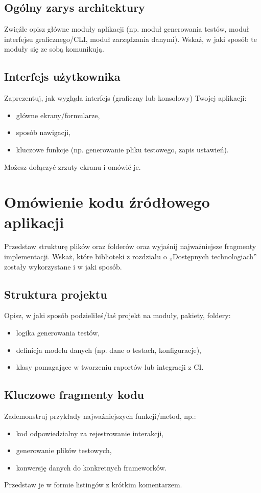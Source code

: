 \documentclass[12pt]{report}
\begin{document}
\section{Ogólny zarys architektury}
{Zwięźle opisz główne moduły aplikacji (np. moduł generowania testów, moduł interfejsu graficznego/CLI, moduł zarządzania danymi). Wskaż, w jaki sposób te moduły się ze sobą komunikują.}

\section{Interfejs użytkownika}
{Zaprezentuj, jak wygląda interfejs (graficzny lub konsolowy) Twojej aplikacji:
\begin{itemize}
    \item główne ekrany/formularze,
    \item sposób nawigacji,
    \item kluczowe funkcje (np. generowanie pliku testowego, zapis ustawień).
\end{itemize}
Możesz dołączyć zrzuty ekranu i omówić je.}


\chapter{Omówienie kodu źródłowego aplikacji}
{Przedstaw strukturę plików oraz folderów oraz wyjaśnij najważniejsze fragmenty implementacji. Wskaż, które biblioteki z rozdziału o „Dostępnych technologiach” zostały wykorzystane i w jaki sposób.}

\section{Struktura projektu}
{Opisz, w jaki sposób podzieliłeś/łaś projekt na moduły, pakiety, foldery:
\begin{itemize}
    \item logika generowania testów,
    \item definicja modelu danych (np. dane o testach, konfiguracje),
    \item klasy pomagające w tworzeniu raportów lub integracji z CI.
\end{itemize}}

\section{Kluczowe fragmenty kodu}
{Zademonstruj przykłady najważniejszych funkcji/metod, np.:
\begin{itemize}
    \item kod odpowiedzialny za rejestrowanie interakcji,
    \item generowanie plików testowych,
    \item konwersję danych do konkretnych frameworków.
\end{itemize}
Przedstaw je w formie listingów z krótkim komentarzem.}
\end{document}
